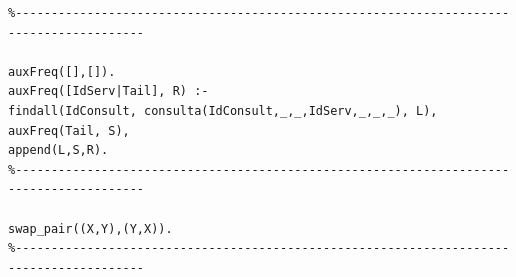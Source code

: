 \documentclass[25pt]{article}
\begin{document}
\begin{lstlisting}
%----------------------------------------------------------------------------------------

auxFreq([],[]).
auxFreq([IdServ|Tail], R) :-
findall(IdConsult, consulta(IdConsult,_,_,IdServ,_,_,_), L),
auxFreq(Tail, S),
append(L,S,R).
%----------------------------------------------------------------------------------------

swap_pair((X,Y),(Y,X)).
%----------------------------------------------------------------------------------------

\end{lstlisting}
\end{document}
